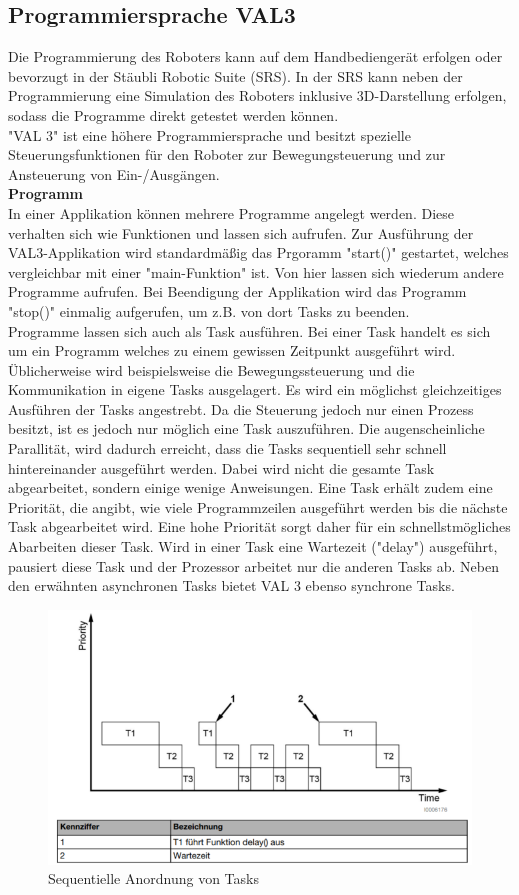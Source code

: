 \documentclass[ a4paper,
                oneside,
                toc=bibliography,
                toc=listof
                ]{scrbook}
\begin{document}
   	\subsection{Programmiersprache VAL3}
   	Die Programmierung des Roboters kann auf dem Handbediengerät erfolgen oder bevorzugt in der Stäubli Robotic Suite (SRS). In der SRS kann neben der Programmierung eine Simulation des Roboters inklusive 3D-Darstellung erfolgen, sodass die Programme direkt getestet werden können.\\
   	"VAL 3" ist eine höhere Programmiersprache und besitzt spezielle Steuerungsfunktionen für den Roboter zur Bewegungsteuerung und zur Ansteuerung von Ein-/Ausgängen. \cite{VAL3}\\
   	\textbf{Programm} \\
   	In einer Applikation können mehrere Programme angelegt werden. Diese verhalten sich wie Funktionen und lassen sich aufrufen. Zur Ausführung der VAL3-Applikation wird standardmäßig das Prgoramm "start()" gestartet, welches vergleichbar mit einer "main-Funktion" ist. Von hier lassen sich wiederum andere Programme aufrufen. Bei Beendigung der Applikation wird das Programm "stop()" einmalig aufgerufen, um z.B. von dort Tasks zu beenden.\\
   	Programme lassen sich auch als Task ausführen. Bei einer Task handelt es sich um ein Programm welches zu einem gewissen Zeitpunkt ausgeführt wird. Üblicherweise wird beispielsweise die Bewegungssteuerung und die Kommunikation in eigene Tasks ausgelagert. Es wird ein möglichst gleichzeitiges Ausführen der Tasks angestrebt. Da die Steuerung jedoch nur einen Prozess besitzt, ist es jedoch nur möglich eine Task auszuführen. Die augenscheinliche Parallität, wird dadurch erreicht, dass die Tasks sequentiell sehr schnell hintereinander ausgeführt werden. Dabei wird nicht die gesamte Task abgearbeitet, sondern einige wenige Anweisungen. Eine Task erhält zudem eine Priorität, die angibt, wie viele Programmzeilen ausgeführt werden bis die nächste Task abgearbeitet wird. Eine hohe Priorität sorgt daher für ein schnellstmögliches Abarbeiten dieser Task. Wird in einer Task eine Wartezeit ("delay") ausgeführt, pausiert diese Task und der Prozessor arbeitet nur die anderen Tasks ab. Neben den erwähnten asynchronen Tasks bietet VAL 3 ebenso synchrone Tasks.
   	\begin{figure}[!ht]
   		\centering
   		\includegraphics[width=0.80\linewidth]{./images/tasks.png}
   		\caption{Sequentielle Anordnung von Tasks \cite{VAL3}} 
   		\label{fig:TX90}
   	\end{figure} \\
\end{document}
